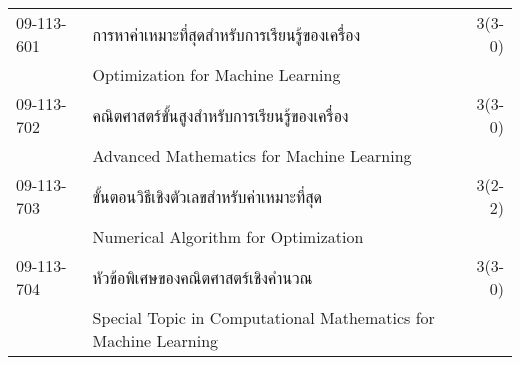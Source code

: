 \begin{longtable}{p{}p{}r{}}
09-113-601 & การหาค่าเหมาะที่สุดสำหรับการเรียนรู้ของเครื่อง & 3(3-0)\\
& Optimization for Machine Learning & \\[3mm]
09-113-702 & คณิตศาสตร์ขั้นสูงสำหรับการเรียนรู้ของเครื่อง & 3(3-0)\\
& Advanced Mathematics for Machine Learning & \\[3mm]
09-113-703 & ขั้นตอนวิธีเชิงตัวเลขสำหรับค่าเหมาะที่สุด  & 3(2-2)\\
& Numerical Algorithm for Optimization & \\[3mm]
09-113-704 & หัวข้อพิเศษของคณิตศาสตร์เชิงคำนวณ  & 3(3-0)\\
& Special Topic in Computational Mathematics for Machine Learning & \\[3mm]
\end{longtable}
